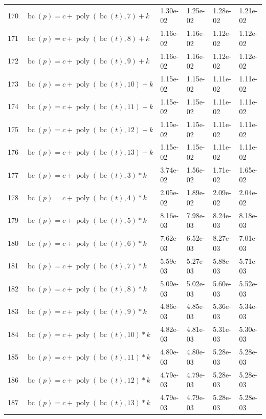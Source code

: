 \documentclass[12pt,a4paper]{article}
\DeclareMathOperator{\bc}{bc}
\DeclareMathOperator{\poly}{poly}
\begin{document}
\begin{longtable}[t]{ll>{\raggedleft\arraybackslash}p{2cm}>{\raggedleft\arraybackslash}p{2cm}>{\raggedleft\arraybackslash}p{2cm}>{\raggedleft\arraybackslash}p{2cm}}
170 & $\bc(p) = c + \poly\left( \bc(t), 7 \right) + k$ & 1.30e-02 & 1.25e-02 & 1.28e-02 & 1.21e-02\\
\rowcolor{gray!6}  171 & $\bc(p) = c + \poly\left( \bc(t), 8 \right) + k$ & 1.16e-02 & 1.16e-02 & 1.12e-02 & 1.12e-02\\
172 & $\bc(p) = c + \poly\left( \bc(t), 9 \right) + k$ & 1.16e-02 & 1.16e-02 & 1.12e-02 & 1.12e-02\\
\rowcolor{gray!6}  173 & $\bc(p) = c + \poly\left( \bc(t), 10 \right) + k$ & 1.15e-02 & 1.15e-02 & 1.11e-02 & 1.11e-02\\
174 & $\bc(p) = c + \poly\left( \bc(t), 11 \right) + k$ & 1.15e-02 & 1.15e-02 & 1.11e-02 & 1.11e-02\\
\rowcolor{gray!6}  175 & $\bc(p) = c + \poly\left( \bc(t), 12 \right) + k$ & 1.15e-02 & 1.15e-02 & 1.11e-02 & 1.11e-02\\
176 & $\bc(p) = c + \poly\left( \bc(t), 13 \right) + k$ & 1.15e-02 & 1.15e-02 & 1.11e-02 & 1.11e-02\\
\rowcolor{gray!6}  177 & $\bc(p) = c + \poly\left( \bc(t), 3 \right) * k$ & 3.74e-02 & 1.56e-02 & 1.71e-02 & 1.65e-02\\
178 & $\bc(p) = c + \poly\left( \bc(t), 4 \right) * k$ & 2.05e-02 & 1.89e-02 & 2.09e-02 & 2.04e-02\\
\rowcolor{gray!6}  179 & $\bc(p) = c + \poly\left( \bc(t), 5 \right) * k$ & 8.16e-03 & 7.98e-03 & 8.24e-03 & 8.18e-03\\
180 & $\bc(p) = c + \poly\left( \bc(t), 6 \right) * k$ & 7.62e-03 & 6.52e-03 & 8.27e-03 & 7.01e-03\\
\rowcolor{gray!6}  181 & $\bc(p) = c + \poly\left( \bc(t), 7 \right) * k$ & 5.59e-03 & 5.27e-03 & 5.88e-03 & 5.71e-03\\
182 & $\bc(p) = c + \poly\left( \bc(t), 8 \right) * k$ & 5.09e-03 & 5.02e-03 & 5.60e-03 & 5.52e-03\\
\rowcolor{gray!6}  183 & $\bc(p) = c + \poly\left( \bc(t), 9 \right) * k$ & 4.86e-03 & 4.85e-03 & 5.36e-03 & 5.34e-03\\
184 & $\bc(p) = c + \poly\left( \bc(t), 10 \right) * k$ & 4.82e-03 & 4.81e-03 & 5.31e-03 & 5.30e-03\\
\rowcolor{gray!6}  185 & $\bc(p) = c + \poly\left( \bc(t), 11 \right) * k$ & 4.80e-03 & 4.80e-03 & 5.28e-03 & 5.28e-03\\
186 & $\bc(p) = c + \poly\left( \bc(t), 12 \right) * k$ & 4.79e-03 & 4.79e-03 & 5.28e-03 & 5.28e-03\\
\rowcolor{gray!6}  187 & $\bc(p) = c + \poly\left( \bc(t), 13 \right) * k$ & 4.79e-03 & 4.79e-03 & 5.28e-03 & 5.28e-03\\

\end{longtable}
\end{document}
